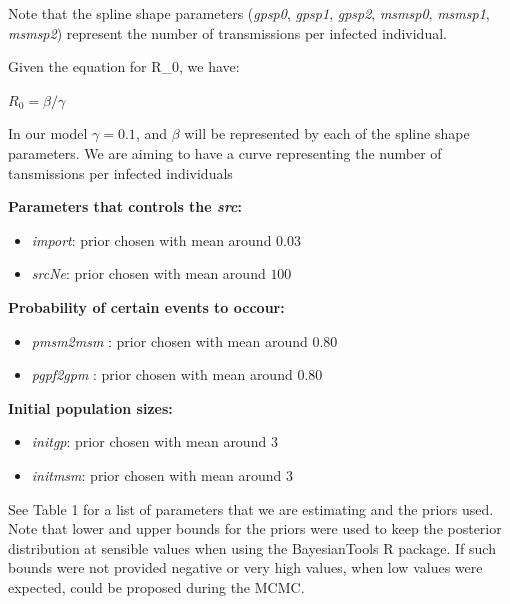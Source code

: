 \documentclass[12pt,]{article}
\providecommand{\tightlist}{%
  \setlength{\itemsep}{0pt}\setlength{\parskip}{0pt}}
\begin{document}
Note that the spline shape parameters (\emph{gpsp0}, \emph{gpsp1},
\emph{gpsp2}, \emph{msmsp0}, \emph{msmsp1}, \emph{msmsp2}) represent the
number of transmissions per infected individual.

Given the equation for R\_0, we have:

\(R_0 = \beta/\gamma\)

In our model \(\gamma = 0.1\), and \(\beta\) will be represented by each
of the spline shape parameters. We are aiming to have a curve
representing the number of tansmissions per infected individuals

\textbf{Parameters that controls the \emph{src}:}

\begin{itemize}
\tightlist
\item
  \emph{import}: prior chosen with mean around \(0.03\)
\item
  \emph{srcNe}: prior chosen with mean around \(100\)
\end{itemize}

\textbf{Probability of certain events to occour:}

\begin{itemize}
\tightlist
\item
  \emph{pmsm2msm} : prior chosen with mean around \(0.80\)
\item
  \emph{pgpf2gpm} : prior chosen with mean around \(0.80\)
\end{itemize}

\textbf{Initial population sizes:}

\begin{itemize}
\tightlist
\item
  \emph{initgp}: prior chosen with mean around \(3\)
\item
  \emph{initmsm}: prior chosen with mean around \(3\)
\end{itemize}

See Table 1 for a list of parameters that we are estimating and the
priors used. Note that lower and upper bounds for the priors were used
to keep the posterior distribution at sensible values when using the
BayesianTools R package. If such bounds were not provided negative or
very high values, when low values were expected, could be proposed
during the MCMC.
\end{document}
